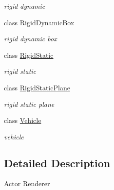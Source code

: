 \begin{DoxyCompactItemize}
\begin{DoxyCompactList}\small\item\em rigid dynamic \item\end{DoxyCompactList}\item 
class \hyperlink{classContent_1_1Actor_1_1Renderer_1_1RigidDynamicBox}{RigidDynamicBox}
\begin{DoxyCompactList}\small\item\em rigid dynamic box \item\end{DoxyCompactList}\item 
class \hyperlink{classContent_1_1Actor_1_1Renderer_1_1RigidStatic}{RigidStatic}
\begin{DoxyCompactList}\small\item\em rigid static \item\end{DoxyCompactList}\item 
class \hyperlink{classContent_1_1Actor_1_1Renderer_1_1RigidStaticPlane}{RigidStaticPlane}
\begin{DoxyCompactList}\small\item\em rigid static plane \item\end{DoxyCompactList}\item 
class \hyperlink{classContent_1_1Actor_1_1Renderer_1_1Vehicle}{Vehicle}
\begin{DoxyCompactList}\small\item\em vehicle \item\end{DoxyCompactList}\end{DoxyCompactItemize}


\subsection{Detailed Description}
Actor Renderer 